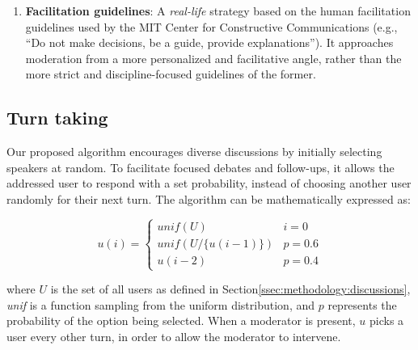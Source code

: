 \begin{enumerate}
    \item \textbf{Facilitation guidelines}: A \emph{real-life} strategy based on the human facilitation guidelines used by the MIT Center for Constructive Communications \cite{dimitra-book} (e.g., “Do not make decisions, be a guide, provide explanations”). It approaches moderation from a more personalized and facilitative angle, rather than the more strict and discipline-focused guidelines of the former.
\end{enumerate}


\subsection{Turn taking}
\label{ssec:experimental:turn}

Our proposed algorithm encourages diverse discussions by initially selecting speakers at random. To facilitate focused debates and follow-ups, it allows the addressed user to respond with a set probability, instead of choosing another user randomly for their next turn. The algorithm can be mathematically expressed as:

\small
\begin{equation}
\label{eq:turn_taking}
    u(i) = \left\{
\begin{array}{ll}
\textit{unif}(U) & i=0\\
    \textit{unif}(U/\{u(i-1)\}) & p=0.6 \\
    u(i-2) & p=0.4 
\end{array} 
\right.
\end{equation}
\normalsize

\noindent where $U$ is the set of all users as defined in Section\ref{ssec:methodology:discussions}, \textit{unif} is a function sampling from the uniform distribution, and $p$ represents the probability of the option being selected. When a moderator is present, $u$ picks a user every other turn, in order to allow the moderator to intervene.

